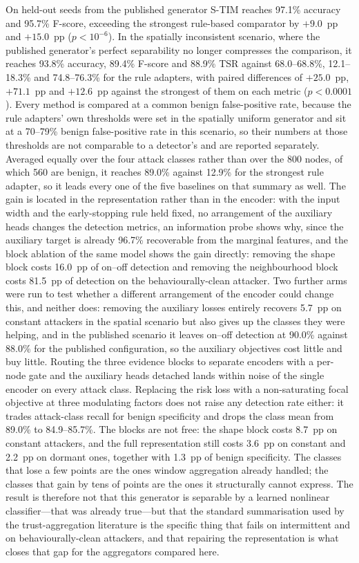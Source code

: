 \documentclass[notspecified,article,submit,moreauthors]{Definitions/mdpi}
\begin{document}
On held-out seeds from the published generator S-TIM reaches 97.1\% accuracy and 95.7\% F-score, exceeding the strongest rule-based comparator by $+9.0$~pp and $+15.0$~pp ($p<10^{-6}$). In the spatially inconsistent scenario, where the published generator's perfect separability no longer compresses the comparison, it reaches 93.8\% accuracy, 89.4\% F-score and 88.9\% TSR against 68.0--68.8\%, 12.1--18.3\% and 74.8--76.3\% for the rule adapters, with paired differences of $+25.0$~pp, $+71.1$~pp and $+12.6$~pp against the strongest of them on each metric ($p<0.0001$). Every method is compared at a common benign false-positive rate, because the rule adapters' own thresholds were set in the spatially uniform generator and sit at a 70--79\% benign false-positive rate in this scenario, so their numbers at those thresholds are not comparable to a detector's and are reported separately. Averaged equally over the four attack classes rather than over the 800 nodes, of which 560 are benign, it reaches 89.0\% against 12.9\% for the strongest rule adapter, so it leads every one of the five baselines on that summary as well. The gain is located in the representation rather than in the encoder: with the input width and the early-stopping rule held fixed, no arrangement of the auxiliary heads changes the detection metrics, an information probe shows why, since the auxiliary target is already 96.7\% recoverable from the marginal features, and the block ablation of the same model shows the gain directly: removing the shape block costs 16.0~pp of on--off detection and removing the neighbourhood block costs 81.5~pp of detection on the behaviourally-clean attacker. Two further arms were run to test whether a different arrangement of the encoder could change this, and neither does: removing the auxiliary losses entirely recovers 5.7~pp on constant attackers in the spatial scenario but also gives up the classes they were helping, and in the published scenario it leaves on--off detection at 90.0\% against 88.0\% for the published configuration, so the auxiliary objectives cost little and buy little. Routing the three evidence blocks to separate encoders with a per-node gate and the auxiliary heads detached lands within noise of the single encoder on every attack class. Replacing the risk loss with a non-saturating focal objective at three modulating factors does not raise any detection rate either: it trades attack-class recall for benign specificity and drops the class mean from 89.0\% to 84.9--85.7\%. The blocks are not free: the shape block costs 8.7~pp on constant attackers, and the full representation still costs 3.6~pp on constant and 2.2~pp on dormant ones, together with 1.3~pp of benign specificity. The classes that lose a few points are the ones window aggregation already handled; the classes that gain by tens of points are the ones it structurally cannot express. The result is therefore not that this generator is separable by a learned nonlinear classifier---that was already true---but that the standard summarisation used by the trust-aggregation literature is the specific thing that fails on intermittent and on behaviourally-clean attackers, and that repairing the representation is what closes that gap for the aggregators compared here.
\end{document}
